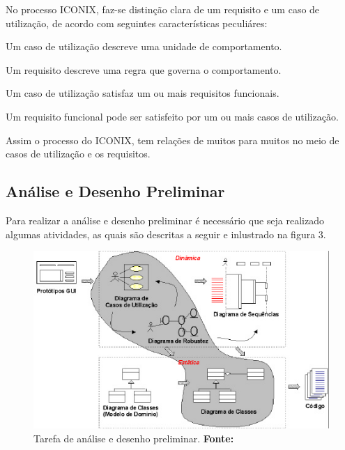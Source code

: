 \par No processo ICONIX, faz-se distinção clara de um requisito e um caso de
utilização, de acordo com  seguintes
características peculiáres:

\begin{citacao}
     \par Um caso de utilização descreve uma unidade de comportamento.
  	 \par Um requisito descreve uma regra que governa o comportamento.
  	 \par Um caso de utilização satisfaz um ou mais requisitos funcionais.
  	 \par Um requisito funcional pode ser satisfeito por um ou mais casos de
			utilização.
\end{citacao}

\par Assim o processo do ICONIX, tem relações de muitos para muitos no meio de
casos de utilização e os requisitos.

\subsection{Análise e Desenho Preliminar}

\par Para realizar a análise e desenho preliminar é necessário que seja
realizado algumas atividades, as quais são descritas a seguir e inlustrado na
figura 3.

\begin{figure}[h!]
  \centerline{\includegraphics[scale=1.2]{./imagens/iconix3.png}}
  \caption[Tarefa de análise e desenho preliminar]
          {Tarefa de análise e desenho preliminar. \textbf{Fonte:}
          \cite{UML_Silva_Videira}}
\label{fig:exemplo1}
\end{figure}

